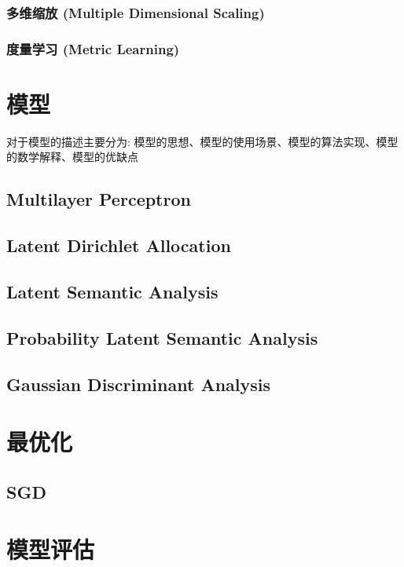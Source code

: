 \documentclass[oneside]{book}
\begin{document}
			\subsection{多维缩放 (Multiple Dimensional Scaling)}
			\subsection{度量学习 (Metric Learning)}
			
			
		
	\chapter{模型}
		对于模型的描述主要分为: 模型的思想、模型的使用场景、模型的算法实现、模型的数学解释、模型的优缺点
		\section{Multilayer Perceptron}
		\section{Latent Dirichlet Allocation}
		\section{Latent Semantic Analysis}
		\section{Probability Latent Semantic Analysis}
		\section{Gaussian Discriminant Analysis}
	\chapter{最优化}
		\section{SGD}
	\chapter{模型评估}
\end{document}
